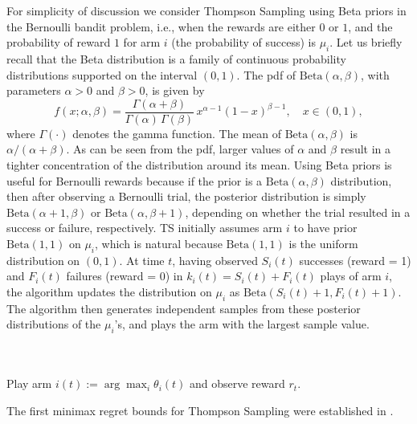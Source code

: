 \documentclass{article}
\numberwithin{equation}{section}
\begin{document}
For simplicity of discussion we consider Thompson Sampling using Beta priors in the Bernoulli bandit problem, i.e., when the rewards are either \(0\) or \(1\), and the probability of reward
\(1\) for arm \(i\) (the probability of success) is \(\mu_i\). Let us briefly recall that the Beta distribution is a family of continuous probability distributions supported on the interval \((0, 1)\). The pdf of \(\mathrm{Beta}(\alpha, \beta)\), with parameters \(\alpha > 0\) and \(\beta > 0\), is given by  
\[
    f(x; \alpha, \beta) = \frac{\Gamma(\alpha + \beta)}{\Gamma(\alpha)\,\Gamma(\beta)} \, x^{\alpha - 1} (1 - x)^{\beta - 1}, \quad x \in (0, 1),
\]  
where \(\Gamma(\cdot)\) denotes the gamma function. The mean of \(\mathrm{Beta}(\alpha, \beta)\) is \(\alpha / (\alpha + \beta)\). As can be seen from the pdf, larger values of \(\alpha\) and \(\beta\) result in a tighter concentration of the distribution around its mean.
Using
Beta priors is useful for Bernoulli rewards because if
the prior is a \(\text{Beta}(\alpha, \beta)\) distribution, then after observing a Bernoulli trial, the posterior distribution is
simply \(\text{Beta}(\alpha+1,\beta)\) or \(\text{Beta}(\alpha,\beta  + 1)\), depending on
whether the trial resulted in a success or failure, respectively.
TS initially assumes arm \(i\) to have prior \(\text{Beta}(1,1)\) on
\(\mu_i\), which is natural because \(\text{Beta}(1,1)\) is the uniform
distribution on \((0,1)\). At time \(t\), having observed \(S_i(t)\)
successes (reward = 1) and \(F_i(t)\) failures (reward = 0)
in \(k_i(t) = S_i(t) + F_i(t)\) plays of arm \(i\), the algorithm
updates the distribution on \(\mu_i\) as \(\text{Beta}(S_i(t)+1, F_i(t)+
1)\). The algorithm then generates independent samples
from these posterior distributions of the \(\mu_i\)'s, and
plays the arm with the largest sample value. 


\begin{algorithm}\label{alg:bernoulli_thompson}
    \centering
    \caption{Thompson Sampling for Bernoulli bandits}
    \begin{algorithmic}[1]
         \\
        
            \\
            \STATE Play arm $i(t) := \arg\max_i \theta_i(t)$ and observe reward $r_t$.\\
        \ENDFOR
    \end{algorithmic}
\end{algorithm}
The first minimax regret bounds for Thompson Sampling were established in \cite{agrawal2017further}.
\end{document}
